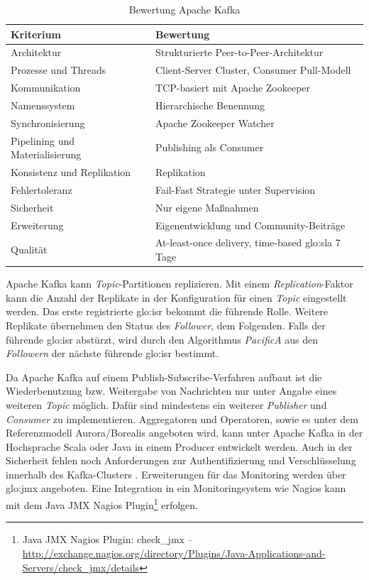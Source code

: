 \begin{table}[ht!]
	\centering
		\begin{tabular}{@{}ll@{}} \toprule
			\textbf{Kriterium} & \textbf{Bewertung} \\ \midrule
			Architektur & Strukturierte Peer-to-Peer-Architektur \\
			Prozesse und Threads & Client-Server Cluster, Consumer Pull-Modell \\
			Kommunikation & TCP-basiert mit Apache Zookeeper \\
			Namenssystem & Hierarchische Benennung \\
			Synchronisierung & Apache Zookeeper Watcher \\
			Pipelining und Materialisierung & Publishing als Consumer \\
			Konsistenz und Replikation & Replikation \\
			Fehlertoleranz & Fail-Fast Strategie unter Supervision \\ %
			Sicherheit & Nur eigene Maßnahmen \\
			Erweiterung & Eigenentwicklung und Community-Beiträge \\
			Qualität & At-least-once delivery, time-based \gls{glo:sla} 7 Tage \\
			\bottomrule			
		\end{tabular}
	\caption{Bewertung Apache Kafka}
	\label{tab:bewkafka}
\end{table}

Apache Kafka kann \textit{Topic}-Partitionen replizieren. Mit einem \textit{Replication}-Faktor kann die Anzahl der Replikate in der Konfiguration für einen \textit{Topic} eingestellt werden. Das erste registrierte \gls{glo:isr} bekommt die führende Rolle. Weitere Replikate übernehmen den Status des \textit{Follower}, dem Folgenden. Falls der führende \gls{glo:isr} abstürzt, wird durch den Algorithmus \textit{PacificA}  aus den \textit{Followern} der nächste führende \gls{glo:isr} bestimmt. 

Da Apache Kafka auf einem Publish-Subscribe-Verfahren aufbaut ist die Wiederbenutzung bzw. Weitergabe von Nachrichten nur unter Angabe eines weiteren \textit{Topic} möglich. Dafür sind mindestens ein weiterer \textit{Publisher} und \textit{Consumer} zu implementieren. Aggregatoren und Operatoren, sowie es unter dem Referenzmodell Aurora/Borealis angeboten wird, kann unter Apache Kafka in der Hochsprache Scala oder Java in einem Producer entwickelt werden. Auch in der Sicherheit fehlen noch Anforderungen zur Authentifizierung und Verschlüsselung innerhalb des Kafka-Clusters . Erweiterungen für das Monitoring werden über \gls{glo:jmx} angeboten. Eine Integration in ein Monitoringsystem wie Nagios kann mit dem Java JMX Nagios Plugin\footnote{Java JMX Nagios Plugin: check\_jmx -- \url{http://exchange.nagios.org/directory/Plugins/Java-Applications-and-Servers/check\_jmx/details}} erfolgen.

